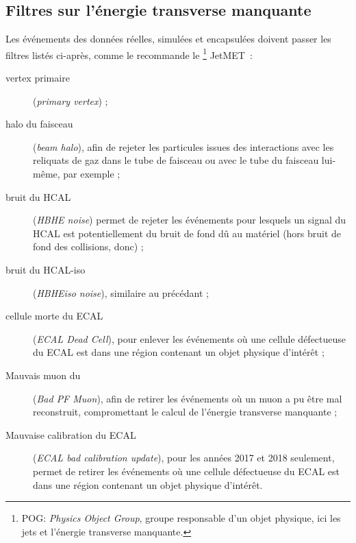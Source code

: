 \subsection{Filtres sur l'énergie transverse manquante}\label{chapter-HTT_analysis-section-MET_filters}
Les événements des données réelles, simulées et encapsulées doivent passer les filtres listés ci-après, comme le recommande le \POG\footnote{POG: \emph{Physics Object Group}, groupe responsable d'un objet physique, ici les jets et l'énergie transverse manquante.} JetMET~\cite{MET_filters}:
\begin{description}
\item[vertex primaire] (\emph{primary vertex}) ;
\item[halo du faisceau] (\emph{beam halo}), afin de rejeter les particules issues des interactions avec les reliquats de gaz dans le tube de faisceau ou avec le tube du faisceau lui-même, par exemple ;
\item[bruit du HCAL] (\emph{HBHE noise}) permet de rejeter les événements pour lesquels un signal du HCAL est potentiellement du bruit de fond dû au matériel (hors bruit de fond des collisions, donc) ;
\item[bruit du HCAL-iso] (\emph{HBHEiso noise}), similaire au précédant ;
\item[cellule morte du ECAL] (\emph{ECAL Dead Cell}), pour enlever les événements où une cellule défectueuse du ECAL est dans une région contenant un objet physique d'intérêt ;
\item[Mauvais muon du \PF] (\emph{Bad PF Muon}), afin de retirer les événements où un muon a pu être mal reconstruit, compromettant le calcul de l'énergie transverse manquante ;
\item[Mauvaise calibration du ECAL] (\emph{ECAL bad calibration update}), pour les années 2017 et 2018 seulement, permet de retirer les événements où une cellule défectueuse du ECAL est dans une région contenant un objet physique d'intérêt.
\end{description}